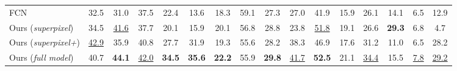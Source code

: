 \begin{table*}[t!]
\begin{center}
\begin{tabular}{lccccccccccccccc}
      FCN  \cite{long2015fully}  & 32.5  & 31.0  & 37.5  & 22.4  & 13.6  & 18.3  & {59.1}  & 27.3  & 27.0  & 41.9  & 15.9  & 26.1  & 14.1 & {6.5}  & 12.9  \\
      \cmidrule(lr){1-1}\cmidrule(lr){2-16}
      Ours (\textit{superpixel}) & 34.5  & \underline{41.6}  & 37.7  & 20.1  & 15.9  & 20.1  & 56.8  & 28.8  & 23.8  & \underline{51.8} & 19.1  & 26.6  & \textbf{29.3} & {6.8}  & {4.7}  \\
      Ours (\textit{superpixel+}) & \underline{42.9}  & {35.9}  & 40.8  & 27.7  & 31.9  & {19.3}  & 55.6  & {28.2}  & {38.3}  & {46.9}  & 17.6  & {31.2}  & 11.0 & {6.5}  & {28.2}  \\
      Ours (\textit{full model}) & 40.7  & \textbf{44.1}  & \underline{42.0}  & \textbf{34.5}  & \textbf{35.6}  & \textbf{22.2}  & 55.9  & \textbf{29.8}  & \underline{41.7}  & \textbf{52.5}  & {21.1}  & \underline{34.4}  & {15.5} & \underline{7.8}  & \underline{29.2}  \\
      \hline
    \end{tabular}


\end{center}
\end{table*}
